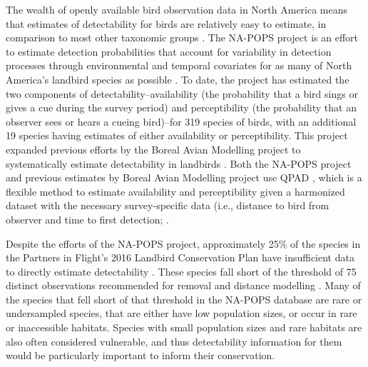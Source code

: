\documentclass[12pt]{article}
\begin{document}
\par The wealth of openly available bird observation data in North America means that estimates of detectability for birds are relatively easy to estimate, in comparison to most other taxonomic groups \citep{bennett_how_2023}. 
The NA-POPS project is an effort to estimate detection probabilities that account for variability in detection processes through environmental and temporal covariates for as many of North America’s landbird species as possible \citep{edwards_point_2023}.
To date, the project has estimated the two components of detectability--availability (the probability that a bird sings or gives a cue during the survey period) and perceptibility (the probability that an observer sees or hears a cueing bird)--for 319 species of birds, with an additional 19 species having estimates of either availability or perceptibility. 
This project expanded previous efforts by the Boreal Avian Modelling project \citep{cumming_toward_2010} to systematically estimate detectability in landbirds \citep{solymos_calibrating_2013, solymos_evaluating_2018}.
Both the NA-POPS project and previous estimates by Boreal Avian Modelling project use QPAD \citep{solymos_calibrating_2013}, which is a flexible method to estimate availability and perceptibility given a harmonized dataset with the necessary survey-specific data (i.e., distance to bird from observer and time to first detection; \citet{barker_ecological_2015}.

\par Despite the efforts of the NA-POPS project, approximately 25\% of the species in the Partners in Flight’s 2016 Landbird Conservation Plan \citep{rosenberg_partners_2016} have insufficient data to directly estimate detectability \citep{edwards_point_2023}.
These species fall short of the threshold of 75 distinct observations recommended for removal and distance modelling \citep{buckland_introduction_2001, solymos_calibrating_2013}. 
Many of the species that fell short of that threshold in the NA-POPS database are rare or undersampled species, that are either have low population sizes, or occur in rare or inaccessible habitats.
Species with small population sizes and rare habitats are also often considered vulnerable, and thus detectability information for them would be particularly important to inform their conservation.
\end{document}
